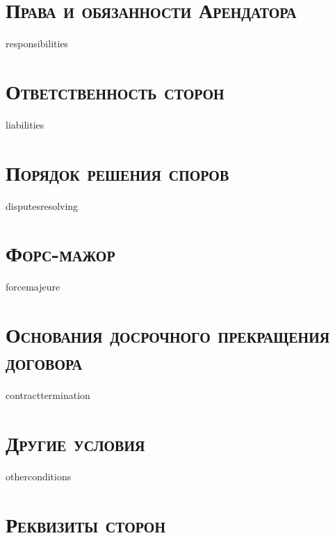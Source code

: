 {{{{{{\section{\large \textbf{\textsc{Права и обязанности Арендатора}}}
{{responsibilities}}

\section{\large \textbf{\textsc{Ответственность сторон}}}
{{liabilities}}

\section{\large \textbf{\textsc{Порядок решения споров}}}
{{disputesresolving}}

\section{\large \textbf{\textsc{Форс-мажор}}}
{{forcemajeure}}

\section{\large \textbf{\textsc{Основания досрочного прекращения договора}}}
{{contracttermination}}

\section{\large \textbf{\textsc{Другие условия}}}
{{otherconditions}}


\section{\large \textbf{\textsc{Реквизиты сторон}}}
\thispagestyle{empty}

\begin{tabularx}{\textwidth}{ X@{\hskip 0.5in} X }


\end{tabularx}}}}}}}
